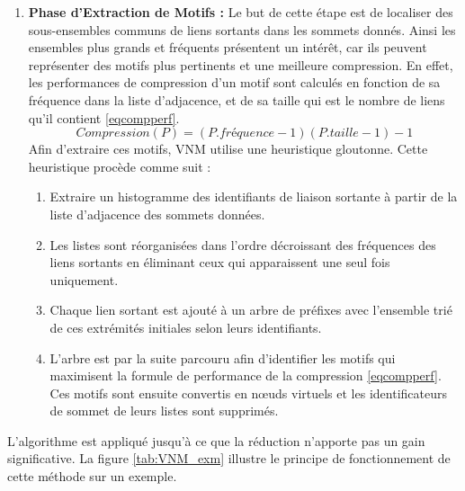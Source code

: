 \begin{enumerate}
					\item \textbf{Phase d'Extraction de Motifs :}				Le but de cette étape est de localiser des sous-ensembles communs de liens sortants dans les sommets donnés. 
				Ainsi les ensembles plus grands et fréquents présentent un intérêt, car ils peuvent représenter des motifs plus pertinents et une meilleure compression. En effet, les performances de compression d'un motif  sont calculés en fonction de sa fréquence dans la liste d'adjacence, et de sa taille qui est le nombre de liens qu'il contient \eqref{eqcompperf}.
				\begin{equation}
				Compression(P)=(P.fréquence-1)(P.taille-1)-1
				\label{eqcompperf}
				\end{equation}
				Afin d'extraire ces motifs, VNM utilise une heuristique gloutonne. Cette heuristique procède comme suit :
				\begin{enumerate}
				\item Extraire un histogramme des identifiants de liaison sortante à partir de la liste d'adjacence des sommets données.
				\item Les listes sont réorganisées dans l'ordre décroissant des fréquences des liens sortants en éliminant ceux qui apparaissent une seul fois uniquement.
				\item Chaque lien sortant est ajouté à un arbre de préfixes avec l'ensemble trié de ces extrémités initiales selon leurs identifiants. 
				\item L'arbre est par la suite parcouru afin d'identifier les motifs qui maximisent la formule de performance de la compression \ref{eqcompperf}. Ces motifs sont ensuite convertis en nœuds virtuels et les identificateurs de sommet de leurs listes sont supprimés.
				\end{enumerate}
				 
				\end{enumerate}
				
				L'algorithme est appliqué jusqu'à ce que la réduction n'apporte pas un gain significative. La figure \ref{tab:VNM_exm} illustre le principe de fonctionnement de cette méthode sur un exemple.
				
				
			
